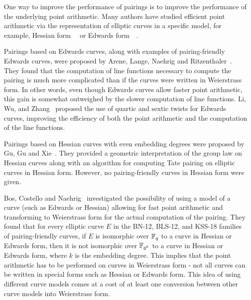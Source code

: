 One way to improve the performance of pairings is
to improve the performance of the underlying point arithmetic.
Many authors have studied efficient point arithmetic via the 
representation of elliptic curves in a specific model,
for example, Hessian form~\cite{2001/smart}~\cite{2001/joye} or
Edwards form~\cite{2007/edwards}~\cite{2007/bernstein-newelliptic}.

Pairings based on Edwards curves,
along with examples of pairing-friendly Edwards curves,
were proposed by Arene, Lange, Naehrig and Ritzenthaler~\cite{2009/fastertate}.
They found that the computation of line functions necessary to compute the pairing
is much more complicated than if the curves were written in Weierstrass form.
In other words,
even though Edwards curves allow faster point arithmetic,
this gain is somewhat outweighed by the slower computation of line functions.
Li, Wu, and Zhang~\cite{2014/LWZ} proposed the use of quartic and sextic twists
for Edwards curves, improving the efficiency of both the point arithmetic and
the computation of the line functions.

Pairings based on Hessian curves with even embedding degrees were proposed by Gu, Gu and Xie~\cite{2010/Gu}.
They provided a geometric interpretation of the group law on Hessian curves
along with an algorithm for computing Tate pairing on elliptic curves in Hessian form.
However, no pairing-friendly curves in Hessian form were given.

Bos, Costello and Naehrig~\cite{2013/bos-pairing} investigated the possibility of
using a model of a curve (such as Edwards or Hessian) allowing for fast point arithmetic
and transforming to Weierstrass form for the actual computation of the pairing.
They found that for every elliptic curve $E$ in the BN-12, BLS-12, and KSS-18 families of pairing-friendly curves,
if $E$ is isomorphic over $\mathbb{F}_{q}$ to a curve in Hessian or Edwards form,
then it is not isomorphic over $\mathbb{F}_{q^{k}}$ to a curve in Hessian or Edwards form,
where $k$ is the embedding degree.
This implies that the point arithmetic has to be performed on curves in Weierstrass form - not all curves can be written in special forms such as Hessian or Edwards form.
This idea of using different curve models comes at a cost of at least one conversion
between other curve models into Weierstrass form.

